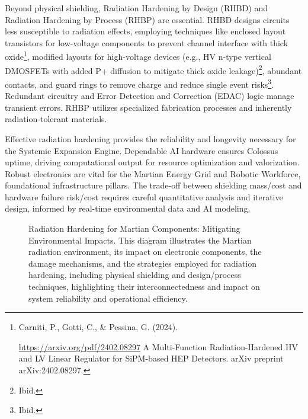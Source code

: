 \documentclass[fontsize=10pt, oneside, DIV=calc]{scrartcl}
\begin{document}
\medskip

\noindent
Beyond physical shielding, Radiation Hardening by Design (RHBD) and Radiation Hardening by Process (RHBP) are essential. RHBD designs circuits less susceptible to radiation effects, employing techniques like enclosed layout transistors for low-voltage components to prevent channel interface with thick oxide\footnote{Carniti, P., Gotti, C., \& Pessina, G. (2024). 







\href{https://arxiv.org/pdf/2402.08297}\url{https://arxiv.org/pdf/2402.08297} A Multi-Function Radiation-Hardened HV and LV Linear Regulator for SiPM-based HEP Detectors. arXiv preprint arXiv:2402.08297.}, modified layouts for high-voltage devices (e.g., HV n-type vertical DMOSFETs with added P+ diffusion to mitigate thick oxide leakage)\footnote{Ibid.}, abundant contacts, and guard rings to remove charge and reduce single event risks\footnote{Ibid.}. Redundant circuitry and Error Detection and Correction (EDAC) logic manage transient errors. RHBP utilizes specialized fabrication processes and inherently radiation-tolerant materials.

\medskip

\noindent
Effective radiation hardening provides the reliability and longevity necessary for the Systemic Expansion Engine. Dependable AI hardware ensures Colossus uptime, driving computational output for resource optimization and valorization. Robust electronics are vital for the Martian Energy Grid and Robotic Workforce, foundational infrastructure pillars. The trade-off between shielding mass/cost and hardware failure risk/cost requires careful quantitative analysis and iterative design, informed by real-time environmental data and AI modeling.



\begin{figure}[H]
  \centering
  \noindent
  \begin{minipage}{\textwidth}
    \centering
    \caption{Radiation Hardening for Martian Components: Mitigating Environmental Impacts. This diagram illustrates the Martian radiation environment, its impact on electronic components, the damage mechanisms, and the strategies employed for radiation hardening, including physical shielding and design/process techniques, highlighting their interconnectedness and impact on system reliability and operational efficiency.}
  \end{minipage}
\end{figure}
\end{document}
